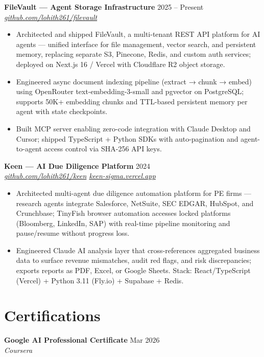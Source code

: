 \documentclass[10pt,letterpaper]{article}
\newcommand{\entry}[3]{%
  \vspace{3pt}\textbf{#1} \hfill #3 \\
  \textit{\small #2}\vspace{1pt}}
\begin{document}
\entry{FileVault --- Agent Storage Infrastructure}{\href{https://github.com/lohith261/filevault}{github.com/lohith261/filevault}}{2025 -- Present}
\begin{itemize}
  \item Architected and shipped FileVault, a multi-tenant REST API platform for AI agents --- unified interface for file management, vector search, and persistent memory, replacing separate S3, Pinecone, Redis, and custom auth services; deployed on Next.js 16 / Vercel with Cloudflare R2 object storage.
  \item Engineered async document indexing pipeline (extract → chunk → embed) using OpenRouter text-embedding-3-small and pgvector on PostgreSQL; supports 50K+ embedding chunks and TTL-based persistent memory per agent with state checkpoints.
  \item Built MCP server enabling zero-code integration with Claude Desktop and Cursor; shipped TypeScript + Python SDKs with auto-pagination and agent-to-agent access control via SHA-256 API keys.
\end{itemize}

\entry{Keen --- AI Due Diligence Platform}{\href{https://github.com/lohith261/keen}{github.com/lohith261/keen} \quad\textbullet\quad \href{https://keen-sigma.vercel.app/}{keen-sigma.vercel.app}}{2024}
\begin{itemize}
  \item Architected multi-agent due diligence automation platform for PE firms --- research agents integrate Salesforce, NetSuite, SEC EDGAR, HubSpot, and Crunchbase; TinyFish browser automation accesses locked platforms (Bloomberg, LinkedIn, SAP) with real-time pipeline monitoring and pause/resume without progress loss.
  \item Engineered Claude AI analysis layer that cross-references aggregated business data to surface revenue mismatches, audit red flags, and risk discrepancies; exports reports as PDF, Excel, or Google Sheets. Stack: React/TypeScript (Vercel) + Python 3.11 (Fly.io) + Supabase + Redis.
\end{itemize}

\section{Certifications}

\textbf{Google AI Professional Certificate} \hfill Mar 2026 \\
\textit{Coursera}
\end{document}
